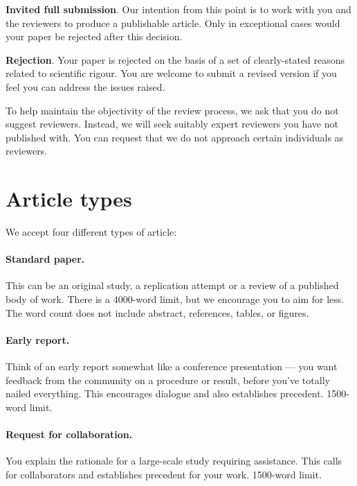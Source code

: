 \documentclass[twocolumn]{article}
\let\tempthree\enumerate
\let\tempfour\endenumerate
\renewenvironment{enumerate}{\tempthree\setlength{\itemsep}{0pt}}{\tempfour}
\begin{document}
\begin{enumerate}
  
\item \textbf{Invited full submission}. Our intention from this point is to work with you and the reviewers to produce a publishable article. Only in exceptional cases would your paper be rejected after this decision.
  
\item \textbf{Rejection}. Your paper is rejected on the basis of a set of clearly-stated reasons related to scientific rigour. You are welcome to submit a revised version if you feel you can address the issues raised.

\end{enumerate}

To help maintain the objectivity of the review process, we ask that you do not suggest reviewers. Instead, we will seek suitably expert reviewers you have not published with. You can request that we do not approach certain individuals as reviewers. 

\section{Article types}

We accept four different types of article:

\paragraph{Standard paper.} This can be an original study, a replication attempt or a review of a published body of work. There is a 4000-word limit, but we encourage you to aim for less. The word count does not include abstract, references, tables, or figures.

\paragraph{Early report.} Think of an early report somewhat like a conference presentation — you want feedback from the community on a procedure or result, before you’ve totally nailed everything. This encourages dialogue and also establishes precedent. 1500-word limit.

\paragraph{Request for collaboration.} You explain the rationale for a large-scale study requiring assistance. This calls for collaborators and establishes precedent for your work. 1500-word limit.
\end{document}
